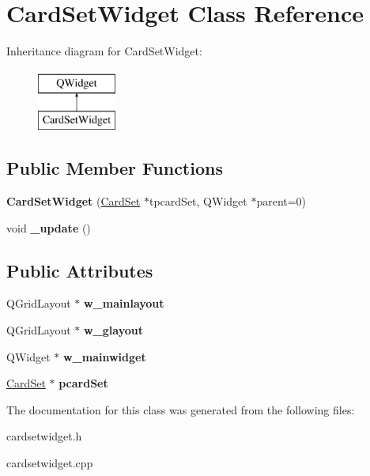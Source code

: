 \hypertarget{class_card_set_widget}{}\section{Card\+Set\+Widget Class Reference}
\label{class_card_set_widget}
Inheritance diagram for Card\+Set\+Widget\+:\begin{figure}[H]
\begin{center}
\leavevmode
\includegraphics[height=2.000000cm]{class_card_set_widget}
\end{center}
\end{figure}
\subsection*{Public Member Functions}
\begin{DoxyCompactItemize}
\item 
\mbox{\label{class_card_set_widget_a81a41cbdce77cfca7dd118ae0cf0b3fe}} 
{\bfseries Card\+Set\+Widget} (\hyperlink{class_card_set}{Card\+Set} $\ast$tpcard\+Set, Q\+Widget $\ast$parent=0)
\item 
\mbox{\label{class_card_set_widget_a565197943c3919bb14117133d351bc67}} 
void {\bfseries \+\_\+update} ()
\end{DoxyCompactItemize}
\subsection*{Public Attributes}
\begin{DoxyCompactItemize}
\item 
\mbox{\label{class_card_set_widget_aa21084283c057497f40de8a19ba03c89}} 
Q\+Grid\+Layout $\ast$ {\bfseries w\+\_\+mainlayout}
\item 
\mbox{\label{class_card_set_widget_adedb07d0aef53fe5e02843df01920cd3}} 
Q\+Grid\+Layout $\ast$ {\bfseries w\+\_\+glayout}
\item 
\mbox{\label{class_card_set_widget_aafc82808936be8d82723ad11ec5fd55c}} 
Q\+Widget $\ast$ {\bfseries w\+\_\+mainwidget}
\item 
\mbox{\label{class_card_set_widget_abe9de3a3f7ef9d7010fad6a7eac862b7}} 
\hyperlink{class_card_set}{Card\+Set} $\ast$ {\bfseries pcard\+Set}
\end{DoxyCompactItemize}


The documentation for this class was generated from the following files\+:\begin{DoxyCompactItemize}
\item 
cardsetwidget.\+h\item 
cardsetwidget.\+cpp\end{DoxyCompactItemize}
